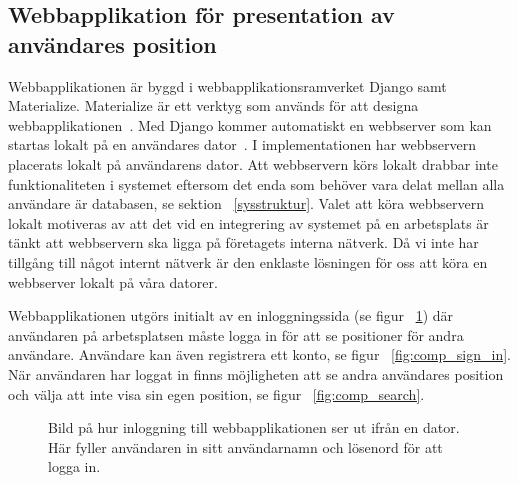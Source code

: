 \documentclass[a4paper,12pt]{article}
\begin{document}
 \subsection{Webbapplikation för presentation av användares position} \label{webbinterface}
 Webbapplikationen är byggd i webbapplikationsramverket Django samt Materialize. Materialize är ett verktyg som används för att designa webbapplikationen~\cite{materialize}. Med Django kommer automatiskt en webbserver som kan startas lokalt på en användares dator~\cite{djangoMVC}. I implementationen har webbservern placerats lokalt på användarens dator. Att webbservern körs lokalt drabbar inte funktionaliteten i systemet eftersom det enda som behöver vara delat mellan alla användare är databasen, se sektion ~\ref{sysstruktur}. Valet att köra webbservern lokalt motiveras av att det vid en integrering av systemet på en arbetsplats är tänkt att webbservern ska ligga på företagets interna nätverk. Då vi inte har tillgång till något internt nätverk är den enklaste lösningen för oss att köra en webbserver lokalt på våra datorer.

 Webbapplikationen utgörs initialt av en inloggningssida (se figur ~\ref{fig:comp_log_in}) där användaren på arbetsplatsen måste logga in för att se positioner för andra användare. Användare kan även registrera ett konto, se figur ~\ref{fig:comp_sign_in}. När användaren har loggat in finns möjligheten att se andra användares position och välja att inte visa sin egen position, se figur ~\ref{fig:comp_search}.

 \begin{figure}[H]
   \centering
   \caption{Bild på hur inloggning till webbapplikationen ser ut ifrån en dator. Här fyller användaren in sitt användarnamn och lösenord för att logga in.}
   \label{fig:comp_log_in}
 \end{figure}
\end{document}
